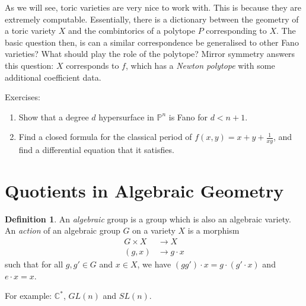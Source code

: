 \documentclass{article}
\theoremstyle{definition}
\newtheorem{defn}{Definition}
\newcommand{\C}{\mathbb{C}}
\newcommand{\bP}{\mathbb{P}}
\begin{document}
As we will see, toric varieties are very nice to work with. This is because they are extremely computable. Essentially, there is a dictionary between the geometry of a toric variety $X$ and the combintorics of a polytope $P$ corresponding to $X$. The basic question then, is can a similar correspondence be generalised to other Fano varieties? What should play the role of the polytope? Mirror symmetry answers this question: $X$ corresponds to $f$, which has a \emph{Newton polytope} with some additional coefficient data. \vspace{1em}

Exercises:
\begin{enumerate}
	\item Show that a degree $d$ hypersurface in $\bP^n$ is Fano for $d<n+1$.
	\item Find a closed formula for the classical period of $f(x,y)=x+y+\frac{1}{xy}$, and find a differential equation that it satisfies.
\end{enumerate}
\pagebreak

\section{Quotients in Algebraic Geometry}
\begin{defn}
	An \emph{algebraic} group is a group which is also an algebraic variety. An \emph{action} of an algebraic group $G$ on a variety $X$ is a morphism 
	\begin{align*}
		G\times X &\to X\\
		(g, x) &\to g\cdot x
	\end{align*}
	such that for all $g,g' \in G$ and $x\in X$, we have $(gg')\cdot x = g\cdot (g'\cdot x)$ and $e\cdot x = x$.
\end{defn}
For example: $\C^\ast$, $GL(n)$ and $SL(n)$. \vspace{1em}
\end{document}
